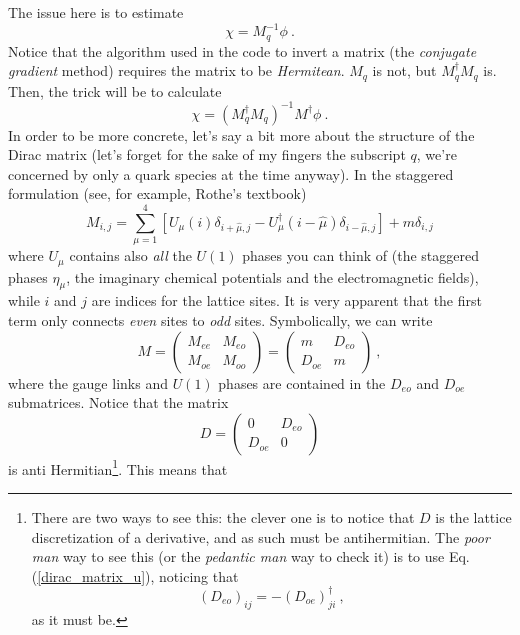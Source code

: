 The issue here is to estimate
\begin{equation}
 \label{problem}
 \chi = M_q^{-1} \phi \ . 
\end{equation}
Notice that the algorithm used in the code to invert a 
matrix (the \emph{conjugate gradient} method) requires the matrix to be 
\emph{Hermitean}. $M_q$ is not, but $M_q^\dagger M_q$ is. Then, the trick will 
be to calculate 
\begin{equation}
\label{trick}
 \chi = \left( M_q^\dagger M_q \right)^{-1} M^\dagger \phi \ . 
\end{equation}
In order to be more concrete, let's say a bit more about the structure of the 
Dirac matrix (let's forget for the sake of my fingers the subscript $q$, we're 
concerned by only a quark species at the time anyway). In the staggered 
formulation (see, for example, Rothe's textbook)
\begin{equation}
\label{dirac_matrix_u}
 M_{i,j} = \sum_{\mu = 1}^4 \left[ U_\mu(i) \delta_{i+\hat{\mu},j}- 
U_\mu^\dagger (i-\hat{\mu}) \delta_{i-\hat{\mu},j} \right] + m\delta_{i,j}
\end{equation}
where $U_\mu$ contains also \emph{all} the $U(1)$ phases you can think of 
(the staggered phases $\eta_\mu$, the imaginary chemical potentials and the 
electromagnetic fields), while $i$ and $j$ are indices for the lattice sites. 
It is very apparent that the first term only connects \emph{even} sites to 
\emph{odd} sites. Symbolically, we can write
\[ M = \left( \begin{array}{cc}
M_{ee} & M_{eo} \\
M_{oe} & M_{oo} 
\end{array}
\right) =
\left( \begin{array}{cc}
m & D_{eo} \\
D_{oe} & m 
\end{array}
\right) \ ,
\]
where the gauge links and $U(1)$ phases are contained in the $D_{eo}$ and 
$D_{oe}$ submatrices. Notice that the matrix  
\[ D = \left( \begin{array}{cc}
0 & D_{eo} \\
D_{oe} & 0 
\end{array}
\right)
\]
is anti Hermitian\footnote{There are two ways to see this: the clever one is to 
notice that $D$ is the lattice discretization of a derivative, and as such must 
be antihermitian. The \emph{poor man} way to see this (or the \emph{pedantic 
man} way to check it) is to use Eq.(\ref{dirac_matrix_u}), noticing that 
\begin{equation}
 \left(D_{eo}\right)_{ij} = - \left(D_{oe}\right)_{ji}^\dagger \ , 
\end{equation}
as it must be.
}. This means that 
